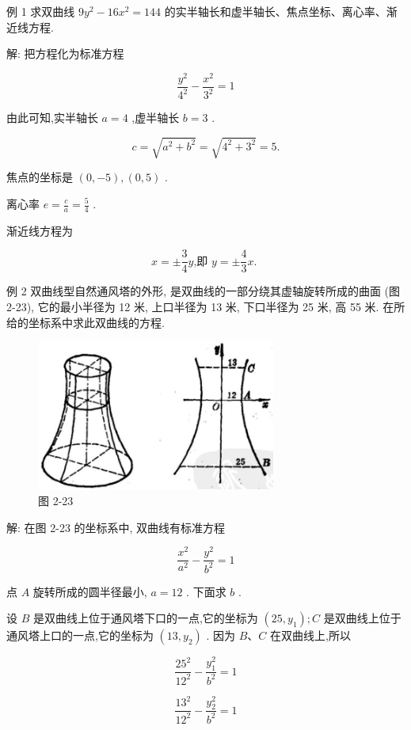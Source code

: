 \documentclass[lang=cn,newtx,12pt,scheme=chinese]{elegantbook}
\begin{document}
例 1 求双曲线 \(9{y}^{2} - {16}{x}^{2} = {144}\) 的实半轴长和虚半轴长、焦点坐标、离心率、渐近线方程.

解: 把方程化为标准方程

\[
  \frac{{y}^{2}}{{4}^{2}} - \frac{{x}^{2}}{{3}^{2}} = 1
\]

由此可知,实半轴长 \(a = 4\) ,虚半轴长 \(b = 3\) .

\[
  c = \sqrt{{a}^{2} + {b}^{2}} = \sqrt{{4}^{2} + {3}^{2}} = 5.
\]

焦点的坐标是 \(\left( {0, - 5}\right) ,\left( {0,5}\right)\) .

离心率 \(e = \frac{c}{a} = \frac{5}{4}\) .

渐近线方程为

\[
  x = \pm \frac{3}{4}y\text{,即 }y = \pm \frac{4}{3}x\text{. }
\]

例 2 双曲线型自然通风塔的外形, 是双曲线的一部分绕其虚轴旋转所成的曲面 (图 2-23), 它的最小半径为 12 米, 上口半径为 13 米, 下口半径为 25 米, 高 55 米. 在所给的坐标系中求此双曲线的方程.

\begin{figure}[h]
  \centering
  \includegraphics[max width=0.7\textwidth]{images/01912cc2-ffb6-728e-9ae7-b113ff05c64b_102_919231.jpg}
  \caption{图 2-23}
\end{figure}

解: 在图 2-23 的坐标系中, 双曲线有标准方程

\[
  \frac{{x}^{2}}{{a}^{2}} - \frac{{y}^{2}}{{b}^{2}} = 1
\]

点 \(A\) 旋转所成的圆半径最小, \(a = {12}\) . 下面求 \(b\) .

设 \(B\) 是双曲线上位于通风塔下口的一点,它的坐标为 \(\left( {{25},{y}_{1}}\right) ;C\) 是双曲线上位于通风塔上口的一点,它的坐标为 \(\left( {{13},{y}_{2}}\right)\) . 因为 \(B\text{、}C\) 在双曲线上,所以

\[
  \frac{{25}^{2}}{{12}^{2}} - \frac{{y}_{1}^{2}}{{b}^{2}} = 1
\]

\[
  \frac{{13}^{2}}{{12}^{2}} - \frac{{y}_{2}^{2}}{{b}^{2}} = 1
\]
\end{document}
